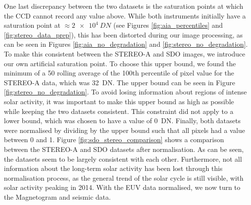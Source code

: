 \documentclass[11pt,a4paper,onecolumn]{report}
\begin{document}
One last discrepancy between the two datasets is the saturation points at which
the CCD cannot record any value above. While both instruments initially have a
saturation point at $\approx \SI[]{2e4}[]{DN}$ (see Figures
\ref{fig:aia_percentiles} and \ref{fig:stereo_data_prep}), this has been
distorted during our image processing, as can be seen in Figures
\ref{fig:aia_no_degradation} and \ref{fig:stereo_no_degradation}. To make this
consistent between the STEREO-A and SDO images, we introduce our own artificial
saturation point. To choose this upper bound, we found the minimum of a 50
rolling average of the 100th percentile of pixel value for the STEREO-A data,
which was \SI[]{32}[]{DN}. The upper bound can be seen in Figure
\ref{fig:stereo_no_degradation}. To avoid losing information about regions of
intense solar activity, it was important to make this upper bound as high as
possible while keeping the two datasets consistent. This constraint did not
apply to a lower bound, which was chosen to have a value of \SI{0}{DN}. Finally,
both datasets were normalised by dividing by the upper bound such that all
pixels had a value between 0 and 1. Figure \ref{fig:sdo_stereo_comparison} shows
a comparison between the STEREO-A and SDO datasets after normalisation. As can
be seen, the datasets seem to be largely consistent with each other.
Furthermore, not all information about the long-term solar activity has been
lost through this normalisation process, as the general trend of the solar cycle
is still visible, with solar activity peaking in 2014. With the EUV data
normalised, we now turn to the Magnetogram and seismic data.
\end{document}
